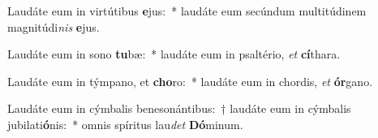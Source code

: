 \item Laudáte eum in virtútibus \textbf{e}jus:~* laudáte eum secúndum multitúdinem magnitúdi\textit{nis} \textbf{e}jus.
\item Laudáte eum in sono \textbf{tu}bæ:~* laudáte eum in psaltério, \textit{et} \textbf{cí}thara.
\item Laudáte eum in týmpano, et \textbf{cho}ro:~* laudáte eum in chordis, \textit{et} \textbf{ór}gano.
\item Laudáte eum in cýmbalis benesonántibus:~† laudáte eum in cýmbalis jubilati\textbf{ó}nis:~* omnis spíritus lau\textit{det} \textbf{Dó}minum.
